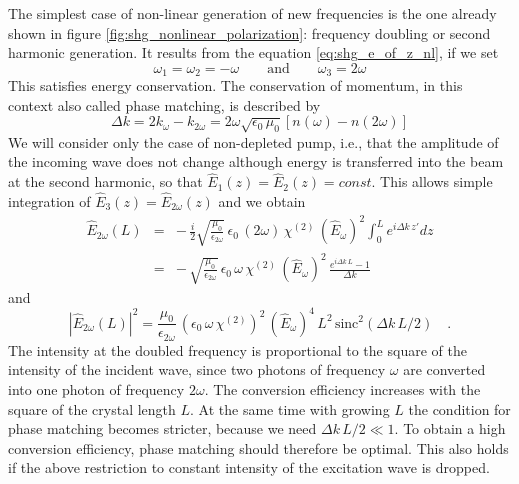 The simplest case of non-linear generation of new frequencies
is the one already shown in figure \ref{fig:shg_nonlinear_polarization}: 
 frequency doubling or second harmonic generation. It results from the equation
\ref{eq:shg_e_of_z_nl}, if we set
\begin{equation}
  \omega_1 = \omega_2 = - \omega \qquad \text{and} \qquad
  \omega_3 = 2\omega
\end{equation}
This satisfies  energy conservation. The
conservation of momentum, in this context also called phase matching, is described by
\begin{equation}
 \Delta k = 2 k_{\omega} - k_{2 \omega} = 2 \omega
 \sqrt{\epsilon_0 \, \mu_0} \left[ n(\omega) - n(2 \omega) \right]
\end{equation}
We will consider only the case of non-depleted pump, i.e., that the amplitude of the incoming wave does not change although energy is transferred into the beam at the second harmonic, so that
$\hat{E}_1(z) = \hat{E}_2(z)
= const$. This allows simple integration of $\hat{E}_3(z) = \hat{E}_{2\omega}(z)$
and we obtain
\begin{eqnarray}
 \hat{E}_{2\omega}(L) &=& - \, \frac{i}{2}   \sqrt{ \frac{\mu_0} {\epsilon_{2\omega}}}\,\epsilon_0
  \, (2 \omega) \, \chi^{(2)} \, (\hat{E}_{\omega})^2   \int_0^L  e^{i  \Delta k \,
  z'} dz  \\
  &= & %
- \,    \sqrt{ \frac{\mu_0} {\epsilon_{2\omega}}}\,\epsilon_0
  \,  \omega \, \chi^{(2)} \, (\hat{E}_{\omega})^2  \, \frac{  e^{i  \Delta k \,
  L} -1}{\Delta k}
\end{eqnarray}
and
\begin{equation}
  \left| \hat{E}_{2\omega}(L) \right|^2 = %
  \frac{\mu_0} {\epsilon_{2\omega}} \, \left(\epsilon_0
  \,  \omega \, \chi^{(2)} \right)^2 \, (\hat{E}_{\omega})^4  \, L^2 \, \text{sinc}^2 ( \Delta k \, L /2 )
   \quad . \label{eq_shg_efficiency_shg}
\end{equation}
The intensity at the doubled frequency is proportional to
the square of the intensity of the incident wave, since two photons
of frequency $\omega$ are converted into one photon of frequency $2\omega$. The conversion efficiency increases with the
square of the crystal  length $L$. At the same time with 
growing $L$ the condition for phase matching becomes stricter, because we need 
$\Delta k \, L / 2 \ll 1 $. To obtain a high
conversion efficiency, phase matching should therefore be
 optimal. This also holds if the above restriction to
constant intensity of the excitation wave is dropped.

